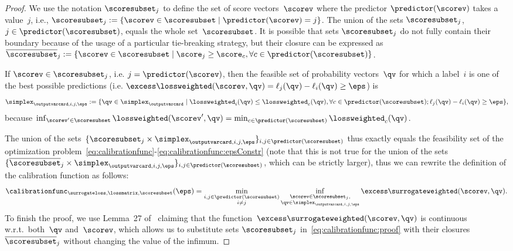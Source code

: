 \documentclass{article}
\begin{document}
\begin{proof}
    We use the notation $\scoresubset_j$ to define the set of score vectors~$\scorev$ where the predictor $\predictor(\scorev)$ takes a value~$j$, i.e., $\scoresubset_j := \{\scorev \in \scoresubset \mid \predictor(\scorev) = j\}$.
    The union of the sets $\scoresubset_j$, $j \in \predictor(\scoresubset)$, equals the whole set~$\scoresubset$.
    It is possible that sets $\scoresubset_j$ do not fully contain their boundary because of the usage of a particular tie-breaking strategy, but their closure can be expressed as $\overline{\scoresubset}_j := \{\scorev \in \scoresubset \mid \score_j \geq  \score_c, \forall c \in \predictor(\scoresubset)\}$.
    
    If $\scorev \in \scoresubset_j$, i.e. $j=\predictor(\scorev)$, then the feasible set of  probability vectors~$\qv$ for which a label~$i$ is one of the best possible predictions (i.e. $\excess\lossweighted(\scorev, \qv) = \ell_j(\qv) - \ell_i(\qv)  \geq \eps$) is $$\simplex_{\outputvarcard,i,j,\eps} := \{ \qv \in \simplex_{\outputvarcard} \mid \lossweighted_i(\qv) \leq \lossweighted_c(\qv), \forall c \in \predictor(\scoresubset); \ell_j(\qv) - \ell_i(\qv) \geq \eps\},$$ because $\inf_{\scorev' \in \scoresubset} \lossweighted(\scorev', \qv) = \min_{c \in \predictor(\scoresubset)} \lossweighted_c(\qv)$.
    
    The union of the sets~$\{\scoresubset_j \times \simplex_{\outputvarcard,i,j,\eps}\}_{i, j \in \predictor(\scoresubset)}$ thus exactly equals the feasibility set of the optimization problem~\eqref{eq:calibrationfunc}-\eqref{eq:calibrationfunc:epsConstr} (note that this is not true for the union of the sets~$\{\overline{\scoresubset}_j \times \simplex_{\outputvarcard,i,j,\eps}\}_{i, j \in \predictor(\scoresubset)}$, which can be strictly larger), thus we can rewrite the definition of the calibration function as follows:
    \begin{equation}
    \label{eq:calibrationfunc:proof}
    \calibrationfunc_{\surrogateloss,\lossmatrix,\scoresubset}(\eps) = \min_{\substack{i, j \in \predictor(\scoresubset) \\ i\neq j}} \inf_{\substack{\scorev \in \scoresubset_j,\\ \qv \in \simplex_{\outputvarcard,i,j,\eps}}} \excess\surrogateweighted(\scorev, \qv).
    \end{equation}
    To finish the proof, we use Lemma~27 of~\citep{zhang04} claiming that the function~$\excess\surrogateweighted(\scorev, \qv)$ is continuous w.r.t.\ both~$\qv$ and~$\scorev$, which allows us to substitute sets $\scoresubset_j$ in~\eqref{eq:calibrationfunc:proof} with their closures~$\overline{\scoresubset}_j$ without changing the value of the infimum.
%
%
%
%
%
%
%
%
%
%
\end{proof}
\end{document}
